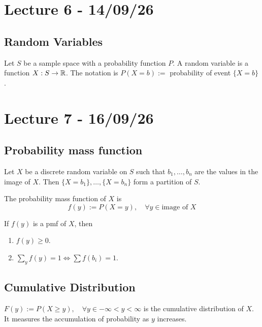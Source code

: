 \documentclass[11pt]{article}
\begin{document}
\section{Lecture 6 - 14/09/26}
\subsection{Random Variables}
\begin{definition}
    Let $S$ be a sample space with a probability function $P$. A random variable is a function $X: S \rightarrow \mathbb{R}$.
    The notation is $P(X=b) :=$ probability of event $\{X = b\}$.
\end{definition}

\section{Lecture 7 - 16/09/26}
\subsection{Probability mass function}
\begin{theorem}
Let $X$ be a discrete random variable on $S$ such that $b_1, \dots, b_n$ are the values in the image of $X$. Then $\{X=b_1\}, \dots, \{X =b_n\}$ form a partition of $S$.
\end{theorem}
\begin{definition}
    The probability mass function of $X$ is 
    \[
        f(y) := P(X = y), \quad \forall y \in \text{image of } X
    \]
\end{definition}
\begin{theorem}
    If $f(y)$ is a pmf of $X$, then
    \begin{enumerate}
        \item $f(y) \ge 0$.
        \item $\sum_{y}f(y) = 1 \iff \sum f(b_i) = 1$.
    \end{enumerate}
\end{theorem}
\subsection{Cumulative Distribution}
\begin{definition}
    $F(y):= P(X \ge y), \quad \forall y \in -\infty < y < \infty$ is the cumulative distribution of $X$. It measures the accumulation of probability as $y$ increases.
\end{definition}
\end{document}
